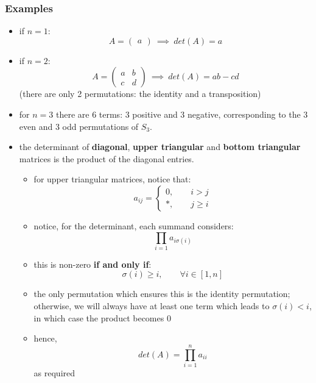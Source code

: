 \documentclass{exam}
\begin{document}
\subsubsection{Examples}

\begin{itemize}
    \item if $n = 1$:
    \[
    A = \begin{pmatrix}
    a
    \end{pmatrix}
    \ \implies \ 
    det(A) = a
    \]
    \item if $n = 2$:
    \[
    A = \begin{pmatrix}
    a & b \\
    c & d
    \end{pmatrix}
    \ \implies \ 
    det(A) = ab - cd
    \]
    (there are only 2 permutations: the identity and a transposition)
    \item for $n = 3$ there are 6 terms: 3 positive and 3 negative, corresponding to the 3 even and 3 odd permutations of $S_3$. 
    \item the determinant of \textbf{diagonal}, \textbf{upper triangular} and \textbf{bottom triangular} matrices is the product of the diagonal entries. 
    \begin{itemize}
        \item for upper triangular matrices, notice that:
        \[
        a_{ij} = \begin{cases}
        0, \qquad i > j \\
        *, \qquad j \geq i
        \end{cases}
        \]
        \item notice, for the determinant, each summand considers:
        \[
        \prod_{i = 1}a_{i\sigma(i)} 
        \]
        \item this is non-zero \textbf{if and only if}:
        \[
        \sigma(i) \geq i, \qquad \forall i \in [1,n]
        \]
        \item the only permutation which ensures this is the identity permutation; otherwise, we will always have at least one term which leads to $\sigma(i) < i$, in which case the product becomes 0
        \item hence,
        \[
        det(A) = \prod_{i = 1}^n a_{ii}
        \]
        as required
    \end{itemize}
\end{itemize}
\end{document}
